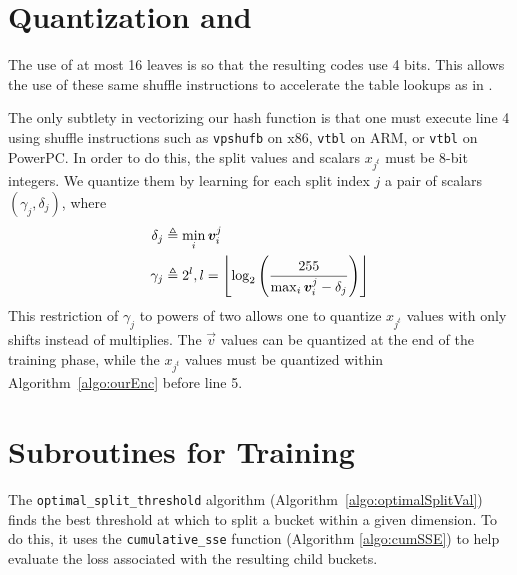 \section{Quantization and \oursHash} \label{sec:hashQuantize}

The use of at most 16 leaves is so that the resulting codes use 4 bits. This allows the use of these same shuffle instructions to accelerate the table lookups as in \citet{bolt}.

The only subtlety in vectorizing our hash function is that one must execute line 4 using shuffle instructions such as \texttt{vpshufb} on x86, \texttt{vtbl} on ARM, or \texttt{vtbl} on PowerPC. In order to do this, the split values and scalars $x_{j^t}$ must be 8-bit integers. We quantize them by learning for each split index $j$ a pair of scalars $(\gamma_j, \delta_j)$, where
\begin{align}
    \delta_j &\triangleq \min_i \bm{v}^j_i \label{eq:offset} \\
    \gamma_j &\triangleq 2^l, l = \left \lfloor  \log_2 \left( \frac{255}{\max_i \bm{v}^j_i - \delta_j} \right) \label{eq:scale}  \right \rfloor
\end{align}
This restriction of $\gamma_j$ to powers of two allows one to quantize $x_{j^t}$ values with only shifts instead of multiplies. The $\vec{v}$ values can be quantized at the end of the training phase, while the $x_{j^t}$ values must be quantized within Algorithm~\ref{algo:ourEnc} before line 5.

\vfill\break  %
\section{Subroutines for Training \oursHash} \label{sec:optimalSplitVal}

The \texttt{optimal\_split\_threshold} algorithm (Algorithm~\ref{algo:optimalSplitVal}) finds the best threshold at which to split a bucket within a given dimension. To do this, it uses the \texttt{cumulative\_sse} function (Algorithm \ref{algo:cumSSE}) to help evaluate the loss associated with the resulting child buckets.

